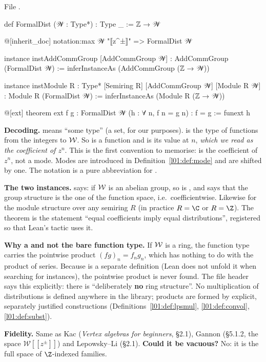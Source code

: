 \noindent File .
\begin{leancode}
def FormalDist (𝒲 : Type*) : Type _ := ℤ → 𝒲

@[inherit_doc] notation:max 𝒲 "⟦z^±⟧" => FormalDist 𝒲

instance instAddCommGroup [AddCommGroup 𝒲] : AddCommGroup (FormalDist 𝒲) :=
  inferInstanceAs (AddCommGroup (ℤ → 𝒲))

instance instModule {R : Type*} [Semiring R] [AddCommGroup 𝒲] [Module R 𝒲] :
    Module R (FormalDist 𝒲) := inferInstanceAs (Module R (ℤ → 𝒲))

@[ext]
theorem ext {f g : FormalDist 𝒲} (h : ∀ n, f n = g n) : f = g := funext h
\end{leancode}

\begin{dictionary}
\textbf{Decoding.}  means ``some type'' (a set, for our purposes).  is the
type of functions from the integers to $\mathcal{W}$. So  is a function and
 is its value at $n$, \emph{which we read as the coefficient of $z^n$}. This is the
first convention to memorise:  is the coefficient of $z^{n}$, not a mode. Modes are
introduced in Definition~\ref{l01:def:mode} and are shifted by one. The notation
 is a pure abbreviation for .

\textbf{The two instances.}  says: if $\mathcal{W}$ is an
abelian group, so is , and  says that
the group structure is the one of the function space, i.e.\ coefficientwise. Likewise for the
module structure over any semiring $R$ (in practice $R = \C$ or $R = \Z$). The
 theorem is the statement ``equal coefficients imply equal distributions'', registered
so that Lean's  tactic uses it.

\textbf{Why a  and not the bare function type.} If $\mathcal{W}$ is a ring, the function type
 carries the pointwise product $(fg)_n = f_ng_n$, which has nothing to do with the
product of series. Because  is a separate definition (Lean does not unfold it
when searching for instances), the pointwise product is never found. The file header says this
explicitly: there is ``deliberately \textbf{no} ring structure''. No multiplication of
distributions is defined anywhere in the library; products are formed by explicit, separately
justified constructions (Definitions~\ref{l01:def:lpsmul}, \ref{l01:def:convol},
\ref{l01:def:subst}).

\textbf{Fidelity.} Same as Kac (\emph{Vertex algebras for beginners}, §2.1), Gannon (§5.1.2,
the space $\mathcal W[[z^{\pm}]]$) and Lepowsky--Li (§2.1). \textbf{Could it be vacuous?} No: it is
the full space of $\Z$-indexed families.
\end{dictionary}

